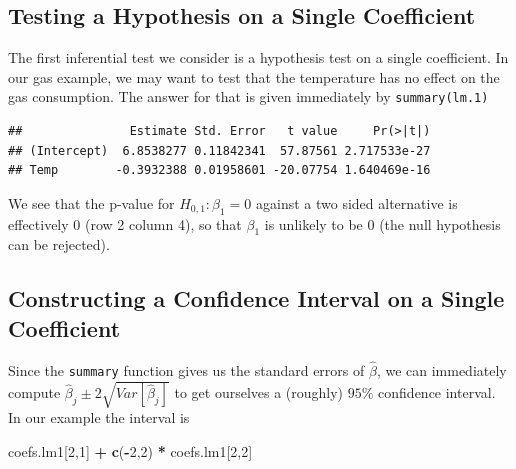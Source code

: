 \documentclass[]{book}
\newenvironment{Shaded}{\begin{snugshade}}{\end{snugshade}}
\newcommand{\KeywordTok}[1]{\textcolor[rgb]{0.13,0.29,0.53}{\textbf{#1}}}
\newcommand{\DecValTok}[1]{\textcolor[rgb]{0.00,0.00,0.81}{#1}}
\newcommand{\StringTok}[1]{\textcolor[rgb]{0.31,0.60,0.02}{#1}}
\newcommand{\OperatorTok}[1]{\textcolor[rgb]{0.81,0.36,0.00}{\textbf{#1}}}
\newcommand{\NormalTok}[1]{#1}
\theoremstyle{definition}
\theoremstyle{definition}
\theoremstyle{definition}
\theoremstyle{remark}
\begin{document}
\subsection{Testing a Hypothesis on a Single
Coefficient}\label{testing-a-hypothesis-on-a-single-coefficient}

The first inferential test we consider is a hypothesis test on a single
coefficient. In our gas example, we may want to test that the
temperature has no effect on the gas consumption. The answer for that is
given immediately by \texttt{summary(lm.1)}

\begin{Shaded}
\end{Shaded}

\begin{verbatim}
##               Estimate Std. Error   t value     Pr(>|t|)
## (Intercept)  6.8538277 0.11842341  57.87561 2.717533e-27
## Temp        -0.3932388 0.01958601 -20.07754 1.640469e-16
\end{verbatim}

We see that the p-value for \(H_{0,1}: \beta_1=0\) against a two sided
alternative is effectively 0 (row 2 column 4), so that \(\beta_1\) is
unlikely to be \(0\) (the null hypothesis can be rejected).

\subsection{Constructing a Confidence Interval on a Single
Coefficient}\label{constructing-a-confidence-interval-on-a-single-coefficient}

Since the \texttt{summary} function gives us the standard errors of
\(\hat \beta\), we can immediately compute
\(\hat \beta_j \pm 2 \sqrt{Var[\hat \beta_j]}\) to get ourselves a
(roughly) \(95\%\) confidence interval. In our example the interval is

\begin{Shaded}
\begin{Highlighting}[]
\NormalTok{coefs.lm1[}\DecValTok{2}\NormalTok{,}\DecValTok{1}\NormalTok{] }\OperatorTok{+}\StringTok{ }\KeywordTok{c}\NormalTok{(}\OperatorTok{-}\DecValTok{2}\NormalTok{,}\DecValTok{2}\NormalTok{) }\OperatorTok{*}\StringTok{ }\NormalTok{coefs.lm1[}\DecValTok{2}\NormalTok{,}\DecValTok{2}\NormalTok{]}
\end{Highlighting}
\end{Shaded}
\end{document}

